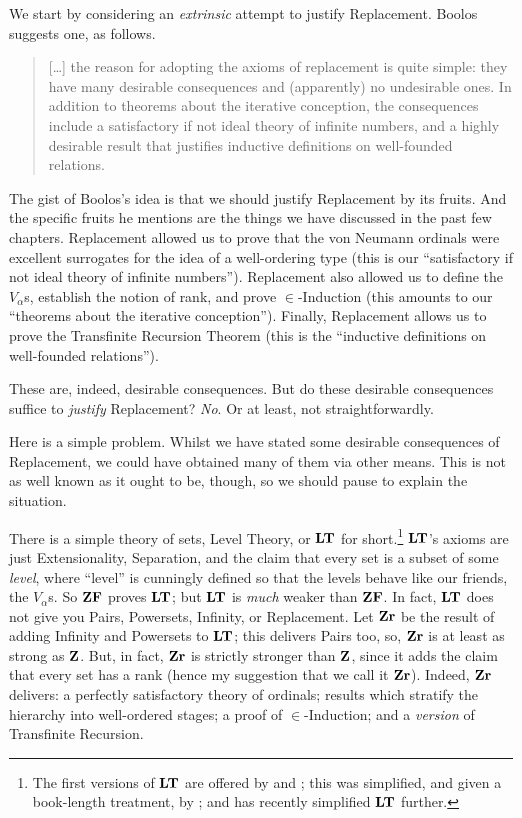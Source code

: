 \documentclass[../../../include/open-logic-section]{subfiles}
\begin{document}

We start by considering an \emph{extrinsic} attempt to justify
Replacement. Boolos suggests one, as follows. 
\begin{quote}
  [\ldots] the reason for adopting the axioms of replacement is quite
  simple: they have many desirable consequences and (apparently) no
  undesirable ones. In addition to theorems about the iterative
  conception, the consequences include a satisfactory if not ideal
  theory of infinite numbers, and a highly desirable result that
  justifies inductive definitions on well-founded relations.
  \citep[229]{Boolos1971}
\end{quote}		
The gist of Boolos's idea is that we should justify Replacement by its
fruits. And the specific fruits he mentions are the things we have
discussed in the past few chapters. Replacement allowed us to prove
that the von Neumann ordinals were excellent surrogates for the idea
of a well-ordering type (this is our ``satisfactory if not ideal
theory of infinite numbers''). Replacement also allowed us to define
the $V_\alpha$s, establish the notion of rank, and prove
$\in$-Induction (this amounts to our ``theorems about the iterative
conception''). Finally, Replacement allows us to prove the Transfinite
Recursion Theorem (this is the ``inductive definitions on well-founded
relations''). 

These are, indeed, desirable consequences. But do these desirable
consequences suffice to \emph{justify} Replacement? \emph{No}. Or at
least, not straightforwardly. 

Here is a simple problem. Whilst we have stated some desirable
consequences of Replacement, we could have obtained many of them via
other means. This is not as well known as it ought to be, though, so we should pause to explain the situation. 

There is a simple theory of sets, Level Theory, or $\mathbf{LT}$ for short.\footnote{The first versions of $\mathbf{LT}$ are offered by \citet{Montague1965} and \citet{Scott1974}; this was simplified, and given a book-length treatment, by \citet{Potter2004}; and \citet{ButtonLT1} has recently simplified $\mathbf{LT}$ further.} $\mathbf{LT}$'s axioms are just Extensionality, Separation, and the claim that every set is a subset of some \emph{level}, where ``level'' is cunningly defined so that the levels behave like our friends, the $V_\alpha$s. So $\mathbf{ZF}$ proves $\mathbf{LT}$; but $\mathbf{LT}$ is \emph{much} weaker than $\mathbf{ZF}$. In fact, $\mathbf{LT}$ does not give you Pairs, Powersets, Infinity, or Replacement. Let $\mathbf{Zr}$ be the result of adding Infinity and Powersets to $\mathbf{LT}$; this delivers Pairs too, so, $\mathbf{Zr}$ is at least as strong as $\mathbf{Z}$. But, in fact, $\mathbf{Zr}$ is strictly stronger than $\mathbf{Z}$, since it adds the claim that every set has a rank (hence my suggestion that we call it $\mathbf{Zr}$). Indeed, $\mathbf{Zr}$ delivers: a perfectly satisfactory theory of ordinals;
results which stratify the hierarchy into well-ordered stages; a proof
of $\in$-Induction; and a \emph{version} of Transfinite Recursion. 
\end{document}
